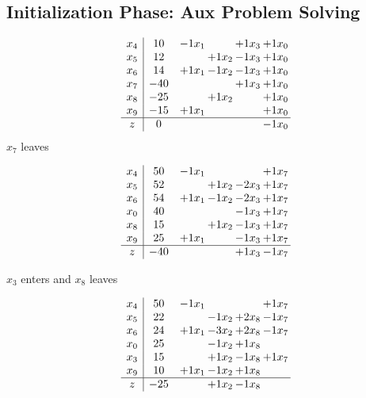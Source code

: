 \documentclass[12pt]{article}
\begin{document}
\subsection{Initialization Phase: Aux Problem Solving}
\[\begin{array}{c| c c@{\hskip 2pt} c@{\hskip 2pt} c@{\hskip 2pt} c@{\hskip 2pt} }
 x_{4}   &  10 & -1  x_{1} &   & + 1  x_{3} & + 1  x_{0}\\
 x_{5}   &  12  &   & + 1  x_{2} & -1  x_{3} & + 1  x_{0}\\
 x_{6}   &  14 & + 1  x_{1} & -1  x_{2} & -1  x_{3} & + 1  x_{0}\\
 x_{7}   &  -40  &    &   & + 1  x_{3} & + 1  x_{0}\\
 x_{8}   &  -25  &   & + 1  x_{2} &   & + 1  x_{0}\\
 x_{9}   &  -15 & + 1  x_{1} &    &   & + 1  x_{0}\\
\hline
z    &  0  &    &    &   & -1  x_{0}\\
\end{array}\]
$ x_{7} $ leaves 

 \[\begin{array}{c| c c@{\hskip 2pt} c@{\hskip 2pt} c@{\hskip 2pt} c@{\hskip 2pt} }
 x_{4}   &  50 & -1  x_{1} &    &   & + 1  x_{7}\\
 x_{5}   &  52  &   & + 1  x_{2} & -2  x_{3} & + 1  x_{7}\\
 x_{6}   &  54 & + 1  x_{1} & -1  x_{2} & -2  x_{3} & + 1  x_{7}\\
 x_{0}   &  40  &    &   & -1  x_{3} & + 1  x_{7}\\
 x_{8}   &  15  &   & + 1  x_{2} & -1  x_{3} & + 1  x_{7}\\
 x_{9}   &  25 & + 1  x_{1} &   & -1  x_{3} & + 1  x_{7}\\
\hline
z    &  -40  &    &   & + 1  x_{3} & -1  x_{7}\\
\end{array}\]


 $ x_{3} $ enters and $ x_{8} $ leaves 

 \[\begin{array}{c| c c@{\hskip 2pt} c@{\hskip 2pt} c@{\hskip 2pt} c@{\hskip 2pt} }
 x_{4}   &  50 & -1  x_{1} &    &   & + 1  x_{7}\\
 x_{5}   &  22  &   & -1  x_{2} & + 2  x_{8} & -1  x_{7}\\
 x_{6}   &  24 & + 1  x_{1} & -3  x_{2} & + 2  x_{8} & -1  x_{7}\\
 x_{0}   &  25  &   & -1  x_{2} & + 1  x_{8} &   \\
 x_{3}   &  15  &   & + 1  x_{2} & -1  x_{8} & + 1  x_{7}\\
 x_{9}   &  10 & + 1  x_{1} & -1  x_{2} & + 1  x_{8} &   \\
\hline
z    &  -25  &   & + 1  x_{2} & -1  x_{8} &   \\
\end{array}\]
\end{document}
